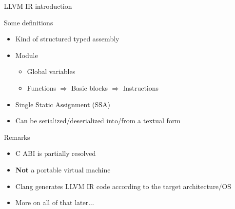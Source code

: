 \begin{frame}{LLVM IR introduction}
  \begin{block}{Some definitions}
    \begin{itemize}
      \item Kind of structured typed assembly
      \item Module
        \begin{itemize}
          \item Global variables
          \item Functions $\Rightarrow$ Basic blocks $\Rightarrow$ Instructions
        \end{itemize}
      \item Single Static Assignment (SSA)
      \item Can be serialized/deserialized into/from a textual form
    \end{itemize}
  \end{block}

  \pause

  \begin{alertblock}{Remarks}
    \begin{itemize}
      \item C ABI is partially resolved
      \item {\bf Not} a portable virtual machine
      \item Clang generates LLVM IR code according to the target architecture/OS
      \item More on all of that later...
    \end{itemize}
  \end{alertblock}
\end{frame}

